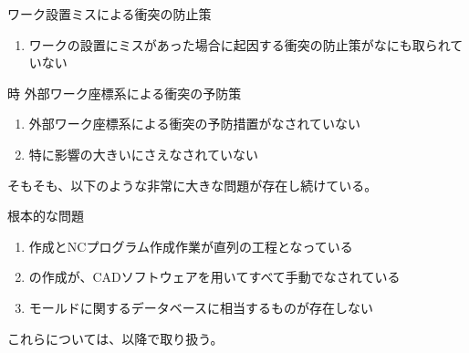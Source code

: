 \begin{Issues}{ワーク設置ミスによる衝突の防止策}
\begin{enumerate}[label=\sarrow]
\item[{\sarrow[red]}]ワークの設置にミスがあった場合に起因する衝突の防止策がなにも取られていない
\end{enumerate}
\end{Issues}

\begin{Issues}{\KeywayMilling 時 外部ワーク座標系による衝突の予防策}
\begin{enumerate}[label=\sarrow]
\item[{\sarrow[red]}]外部ワーク座標系による衝突の予防措置がなされていない
\item[{\sarrow[red]}]特に影響の大きい\KeywayMilling にさえなされていない
\end{enumerate}
\end{Issues}



\clearpage
そもそも、以下のような非常に大きな問題が存在し続けている。

\begin{Issues}{根本的な問題}
\begin{enumerate}[label=\sarrow]
\item[{\sarrow[red]}] \nameDrawing 作成とNCプログラム作成作業が直列の工程となっている
\item[{\sarrow[red]}] \nameDrawing の作成が、CADソフトウェアを用いてすべて手動でなされている
\item[{\sarrow[red]}] モールドに関するデータベースに相当するものが存在しない
\end{enumerate}
\end{Issues}
これらについては、以降で取り扱う。

